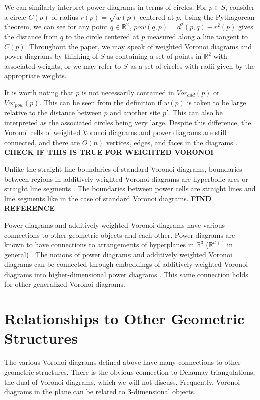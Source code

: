 \documentclass[a4paper, 11pt]{article}
\newcommand{\R}{\mathbb{R}}
\begin{document}
We can similarly interpret power diagrams in terms of circles. For $p \in S$, consider a circle $C(p)$ of radius $r(p) = \sqrt{w(p)}$ centered at $p$. Using the
Pythagorean theorem, we can see for any point $q \in \R^2$, $pow(q,p) = d^2(p,q) - r^2(p)$ gives the distance from $q$ to the circle centered at $p$
measured along a line tangent to $C(p)$. Throughout the paper, we may speak of weighted Voronoi diagrams and power diagrams by thinking of $S$ as
containing a set of points in $\R^2$ with associated weights, or we may refer to $S$ as a set of circles with radii given by the appropriate weights.

It is worth noting that $p$ is not necessarily contained in $Vor_{add}(p)$ or $Vor_{pow}(p)$. This can be seen from the definition if $w(p)$ is taken
to be large relative to the distance between $p$ and another site $p'$. This can also be interpreted as the associated circles being very large.
Despite this difference, the Voronoi cells of weighted Voronoi diagrams and power diagrams are still connected, and there are $O(n)$ vertices, edges,
and faces in the diagrams \cite{aurenhammer_power}. \textbf{CHECK IF THIS IS TRUE FOR WEIGHTED VORONOI}

Unlike the straight-line boundaries of standard
Voronoi diagrams, boundaries between regions in additively weighted Voronoi diagrams are hyperbolic arcs or straight line segments
\cite{aurenhammer_additive}. The boundaries between power cells are straight lines and line segments like in the case of standard Voronoi diagrams.
\textbf{FIND REFERENCE}

Power diagrams and additively weighted Voronoi diagrams have various connections to other geometric objects and each other.
Power diagrams are known to have connections to arrangements of hyperplanes in $\R^3$ ($\R^{d+1}$ in general) \cite{aurenhammer_survey}. The notions
of power diagrams and additively weighted Voronoi diagrams can be connected through embeddings of additively weighted Voronoi diagrams into
higher-dimensional power diagrams \cite{aurenhammer_additive}. This same connection holds for other generalized Voronoi diagrams.

\section{Relationships to Other Geometric Structures}
\label{sec:geom_rel}
The various Voronoi diagrams defined above have many connections to other geometric structures. There is the obvious connection to Delaunay
triangulations, the dual of Voronoi diagrams, which we will not discuss. Frequently, Voronoi diagrams in the plane can be related to 3-dimensional
objects.
\end{document}
